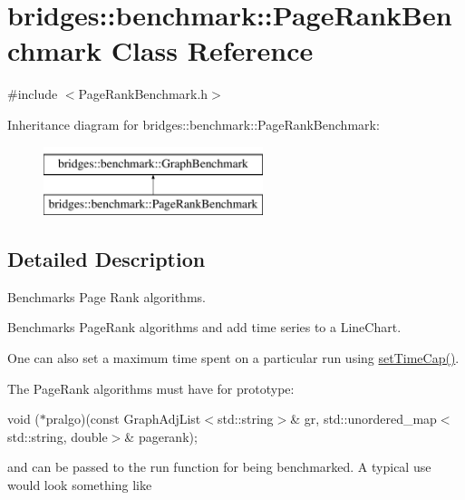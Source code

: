 \hypertarget{classbridges_1_1benchmark_1_1_page_rank_benchmark}{}\section{bridges\+::benchmark\+::Page\+Rank\+Benchmark Class Reference}
\label{classbridges_1_1benchmark_1_1_page_rank_benchmark}


{\ttfamily \#include $<$Page\+Rank\+Benchmark.\+h$>$}

Inheritance diagram for bridges\+::benchmark\+::Page\+Rank\+Benchmark\+:\begin{figure}[H]
\begin{center}
\leavevmode
\includegraphics[height=2.000000cm]{classbridges_1_1benchmark_1_1_page_rank_benchmark}
\end{center}
\end{figure}


\subsection{Detailed Description}
Benchmarks Page Rank algorithms. 

Benchmarks Page\+Rank algorithms and add time series to a Line\+Chart.

One can also set a maximum time spent on a particular run using \mbox{\hyperlink{classbridges_1_1benchmark_1_1_graph_benchmark_a56934eb2789e54c088e7b4423c3a7456}{set\+Time\+Cap()}}.

The Page\+Rank algorithms must have for prototype\+:

void ($\ast$pralgo)(const Graph\+Adj\+List$<$std\+::string$>$\& gr, std\+::unordered\+\_\+map$<$std\+::string, double$>$\& pagerank);

and can be passed to the run function for being benchmarked. A typical use would look something like


\begin{DoxyCode}{0}
\end{DoxyCode}


